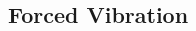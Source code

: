 \documentclass[11pt]{article} %
\begin{document}
\begin{multicols}{2}
\subsection {Forced Vibration}



\end{multicols}
\end{document}
